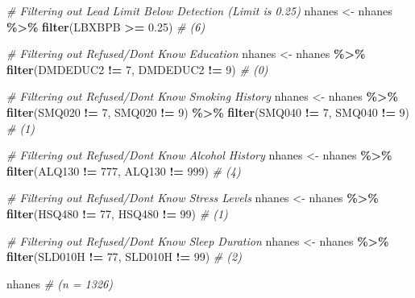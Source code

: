 \documentclass[
]{article}
\newenvironment{Shaded}{\begin{snugshade}}{\end{snugshade}}
\newcommand{\CommentTok}[1]{\textcolor[rgb]{0.56,0.35,0.01}{\textit{#1}}}
\newcommand{\DecValTok}[1]{\textcolor[rgb]{0.00,0.00,0.81}{#1}}
\newcommand{\FloatTok}[1]{\textcolor[rgb]{0.00,0.00,0.81}{#1}}
\newcommand{\FunctionTok}[1]{\textcolor[rgb]{0.13,0.29,0.53}{\textbf{#1}}}
\newcommand{\NormalTok}[1]{#1}
\newcommand{\OtherTok}[1]{\textcolor[rgb]{0.56,0.35,0.01}{#1}}
\newcommand{\SpecialCharTok}[1]{\textcolor[rgb]{0.81,0.36,0.00}{\textbf{#1}}}
\begin{document}
\begin{Shaded}
\begin{Highlighting}[]
\CommentTok{\# Filtering out Lead Limit Below Detection (Limit is 0.25)}
\NormalTok{nhanes }\OtherTok{\textless{}{-}}\NormalTok{ nhanes }\SpecialCharTok{\%\textgreater{}\%} 
  \FunctionTok{filter}\NormalTok{(LBXBPB }\SpecialCharTok{\textgreater{}=} \FloatTok{0.25}\NormalTok{) }\CommentTok{\# (6)}
  
\CommentTok{\# Filtering out Refused/Don\textquotesingle{}t Know Education}
\NormalTok{nhanes }\OtherTok{\textless{}{-}}\NormalTok{ nhanes }\SpecialCharTok{\%\textgreater{}\%} 
  \FunctionTok{filter}\NormalTok{(DMDEDUC2 }\SpecialCharTok{!=} \DecValTok{7}\NormalTok{, DMDEDUC2 }\SpecialCharTok{!=} \DecValTok{9}\NormalTok{) }\CommentTok{\# (0)}

\CommentTok{\# Filtering out Refused/Don\textquotesingle{}t Know Smoking History}
\NormalTok{nhanes }\OtherTok{\textless{}{-}}\NormalTok{ nhanes }\SpecialCharTok{\%\textgreater{}\%} 
  \FunctionTok{filter}\NormalTok{(SMQ020 }\SpecialCharTok{!=} \DecValTok{7}\NormalTok{, SMQ020 }\SpecialCharTok{!=} \DecValTok{9}\NormalTok{) }\SpecialCharTok{\%\textgreater{}\%}  
  \FunctionTok{filter}\NormalTok{(SMQ040 }\SpecialCharTok{!=} \DecValTok{7}\NormalTok{, SMQ040 }\SpecialCharTok{!=} \DecValTok{9}\NormalTok{) }\CommentTok{\# (1)}
  
\CommentTok{\# Filtering out Refused/Don\textquotesingle{}t Know Alcohol History}
\NormalTok{nhanes }\OtherTok{\textless{}{-}}\NormalTok{ nhanes }\SpecialCharTok{\%\textgreater{}\%} 
  \FunctionTok{filter}\NormalTok{(ALQ130 }\SpecialCharTok{!=} \DecValTok{777}\NormalTok{, ALQ130 }\SpecialCharTok{!=} \DecValTok{999}\NormalTok{) }\CommentTok{\# (4)}

\CommentTok{\# Filtering out Refused/Don\textquotesingle{}t Know Stress Levels}
\NormalTok{nhanes }\OtherTok{\textless{}{-}}\NormalTok{ nhanes }\SpecialCharTok{\%\textgreater{}\%} 
  \FunctionTok{filter}\NormalTok{(HSQ480 }\SpecialCharTok{!=} \DecValTok{77}\NormalTok{, HSQ480 }\SpecialCharTok{!=} \DecValTok{99}\NormalTok{) }\CommentTok{\# (1)}

\CommentTok{\# Filtering out Refused/Don\textquotesingle{}t Know Sleep Duration}
\NormalTok{nhanes }\OtherTok{\textless{}{-}}\NormalTok{ nhanes }\SpecialCharTok{\%\textgreater{}\%} 
  \FunctionTok{filter}\NormalTok{(SLD010H }\SpecialCharTok{!=} \DecValTok{77}\NormalTok{, SLD010H }\SpecialCharTok{!=} \DecValTok{99}\NormalTok{) }\CommentTok{\# (2)}

\NormalTok{nhanes }\CommentTok{\# (n = 1326)}
\end{Highlighting}
\end{Shaded}
\end{document}
